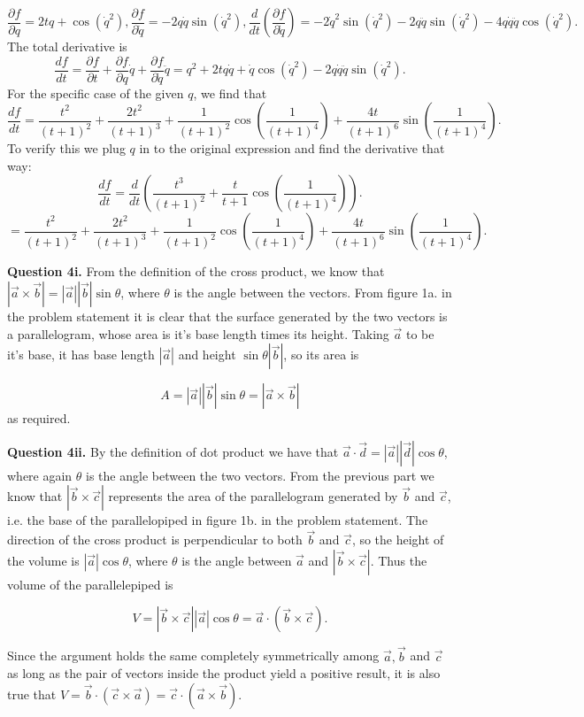 \documentclass[letterpaper, reqno,11pt]{article}
\begin{document}
\[
\frac{\partial f}{\partial q} =2tq+\cos(\dot q^2), \frac{\partial f}{\partial \dot q} =-2q\dot q \sin(\dot q^2), \frac{d}{dt}\left( \frac{\partial f}{\partial \dot q} \right) =-2\dot q^2 \sin(\dot q^2)-2q\ddot q\sin(\dot q^2)-4q\dot q\ddot q\cos(\dot q^2)
.\]
The total derivative is 
\[
\frac{df}{dt}=\frac{\partial f}{\partial t} +\frac{\partial f}{\partial q} \dot q+\frac{\partial f}{\partial \dot q} \ddot q=q^2+2tq\dot q+\dot q\cos(\dot q^2)-2q\dot q\ddot q \sin(\dot q^2)
.\]
For the specific case of the given $q$, we find that 
\[
\frac{df}{dt}=\frac{t^2}{(t+1)^2}+\frac{2t^2}{(t+1)^3}+\frac{1}{(t+1)^2}\cos\left(\frac{1}{(t+1)^4}\right)+\frac{4t}{(t+1)^6}\sin\left( \frac{1}{(t+1)^4} \right) 
.\]
To verify this we plug $q$ in to the original expression and find the derivative that way: 
\[
\frac{df}{dt}=\frac{d}{dt}\left( \frac{t^3}{(t+1)^2}+\frac{t}{t+1}\cos\left(\frac{1}{(t+1)^4}\right) \right) 
.\]
\[
=\frac{t^2}{(t+1)^2}+\frac{2t^2}{(t+1)^3}+\frac{1}{(t+1)^2}\cos\left(\frac{1}{(t+1)^4}\right)+\frac{4t}{(t+1)^6}\sin\left( \frac{1}{(t+1)^4} \right) 
.\]

{\noindent\bf Question 4i.} From the definition of the cross product, we know that $|\vec a\times\vec b|=|\vec a| |\vec b|\sin\theta$, where $\theta$ is the angle between the vectors. From figure 1a. in the problem statement it is clear that the surface generated by the two vectors is a parallelogram, whose area is it's base length times its height. Taking $\vec a$ to be it's base, it has base length $|\vec a|$ and height $\sin\theta|\vec b|$, so its area is 

 \[
A=|\vec a| |\vec b|\sin\theta=|\vec a\times\vec b|
\]
as required. 

{\noindent\bf Question 4ii.} By the definition of dot product we have that $\vec a\cdot\vec d=|\vec a| |\vec d|\cos\theta$, where again $\theta$ is the angle between the two vectors. From the previous part we know that $|\vec b\times\vec c|$ represents the area of the parallelogram generated by $\vec b$ and $\vec c$, i.e. the base of the parallelopiped in figure 1b. in the problem statement. The direction of the cross product is perpendicular to both $\vec b$ and $\vec c$, so the height of the volume is $|\vec a|\cos\theta$, where $\theta$ is the angle between $\vec a$ and $|\vec b\times\vec c|$. Thus the volume of the parallelepiped is 

\[
V=|\vec b\times\vec c| |\vec a|\cos\theta=\vec a\cdot (\vec b\times \vec c)
.\]

Since the argument holds the same completely symmetrically among $\vec a, \vec b$ and $\vec c$ as long as the pair of vectors inside the product yield a positive result, it is also true that $V=\vec b\cdot (\vec c\times\vec a)=\vec c\cdot(\vec a\times\vec b)$. 
\end{document}
